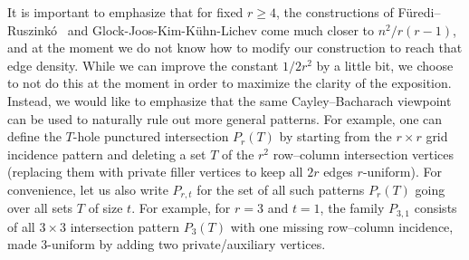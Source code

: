 \documentclass[11pt]{article}
\theoremstyle{definition}
\theoremstyle{remark}
\begin{document}
It is important to emphasize that for fixed $r\ge 4$, the constructions of F\"uredi--Ruszink\'o~\cite{FurediRuszinko} and Glock-Joos-Kim-K{\"u}hn-Lichev \cite{conflictfree} come much closer to $n^2/r(r-1)$, and at the moment we do not know how to modify our construction to reach that edge density. While we can improve the constant $1/2r^{2}$ by a little bit, we choose to not do this at the moment in order to maximize the clarity of the exposition. Instead, we would like to emphasize that the same Cayley--Bacharach viewpoint can be used to naturally rule out more general patterns. For example, one can define the $T$-hole punctured intersection $P_{r}(T)$ by starting from the $r\times r$ grid incidence pattern and deleting a set $T$ of the $r^2$ row--column intersection vertices (replacing them with private filler vertices to keep all $2r$ edges $r$-uniform). For convenience, let us also write $P_{r,t}$ for the set of all such patterns $P_{r}(T)$ going over all sets $T$ of size $t$. For example, for $r=3$ and $t=1$, the family $P_{3,1}$ consists of all $3\times 3$ intersection pattern $P_{3}(T)$ with one missing
row--column incidence, made $3$-uniform by adding two private/auxiliary vertices.
\end{document}
